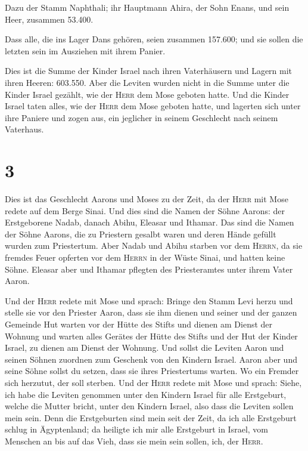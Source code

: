  Dazu der Stamm Naphthali; ihr Hauptmann Ahira, der Sohn
Enans,  und sein Heer, zusammen 53.400.

 Dass alle, die ins Lager Dans gehören, seien zusammen
157.600; und sie sollen die letzten sein im Ausziehen mit ihrem Panier.

 Dies ist die Summe der Kinder Israel nach ihren
Vaterhäusern und Lagern mit ihren Heeren: 603.550.  Aber
die Leviten wurden nicht in die Summe unter die Kinder Israel gezählt,
wie der \textsc{Herr} dem Mose geboten hatte.  Und die
Kinder Israel taten alles, wie der \textsc{Herr} dem Mose geboten hatte,
und lagerten sich unter ihre Paniere und zogen aus, ein jeglicher in
seinem Geschlecht nach seinem Vaterhaus.

\hypertarget{section-2}{%
\section{3}\label{section-2}}

 Dies ist das Geschlecht Aarons und Moses zu der Zeit, da
der \textsc{Herr} mit Mose redete auf dem Berge Sinai. 
Und dies sind die Namen der Söhne Aarons: der Erstgeborene Nadab, danach
Abihu, Eleasar und Ithamar.  Das sind die Namen der Söhne
Aarons, die zu Priestern gesalbt waren und deren Hände gefüllt wurden
zum Priestertum.  Aber Nadab und Abihu starben vor dem
\textsc{Herrn}, da sie fremdes Feuer opferten vor dem \textsc{Herrn} in
der Wüste Sinai, und hatten keine Söhne. Eleasar aber und Ithamar
pflegten des Priesteramtes unter ihrem Vater Aaron.

 Und der \textsc{Herr} redete mit Mose und sprach:
 Bringe den Stamm Levi herzu und stelle sie vor den
Priester Aaron, dass sie ihm dienen  und seiner und der
ganzen Gemeinde Hut warten vor der Hütte des Stifts und dienen am Dienst
der Wohnung  und warten alles Gerätes der Hütte des Stifts
und der Hut der Kinder Israel, zu dienen am Dienst der Wohnung.
 Und sollst die Leviten Aaron und seinen Söhnen zuordnen
zum Geschenk von den Kindern Israel.  Aaron aber und
seine Söhne sollst du setzen, dass sie ihres Priestertums warten. Wo ein
Fremder sich herzutut, der soll sterben.  Und der
\textsc{Herr} redete mit Mose und sprach:  Siehe, ich
habe die Leviten genommen unter den Kindern Israel für alle Erstgeburt,
welche die Mutter bricht, unter den Kindern Israel, also dass die
Leviten sollen mein sein.  Denn die Erstgeburten sind
mein seit der Zeit, da ich alle Erstgeburt schlug in Ägyptenland; da
heiligte ich mir alle Erstgeburt in Israel, vom Menschen an bis auf das
Vieh, dass sie mein sein sollen, ich, der \textsc{Herr}.

